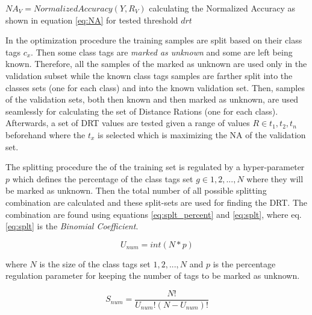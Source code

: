 \begin{algorithm}[H][t]
{{    }

    $NA_{V} = NormalizedAccuracy(Y, R_{V})$ calculating the Normalized Accuracy as shown in equation \ref{eq:NA} for tested threshold $drt$\;


}

\end{algorithm}

\hfill

In the optimization procedure the training samples are split based on their class tags $c_{x}$. Then some class tags are \textit{marked as unknown} and some are left being known. Therefore, all the samples of the marked as unknown are used only in the validation subset while the known class tags samples are farther split into the classes sets (one for each class) and into the known validation set. Then, samples of the validation sets, both then known and then marked as unknown, are used seamlessly for calculating the set of Distance Rations (one for each class). Afterwards, a set of DRT values are tested given a range of values $R \in {t_{1}, t_{2}, t_{n}}$ beforehand where the $t_{x}$ is selected which is maximizing the NA of the validation set.

The splitting procedure the of the training set is regulated by a hyper-parameter $p$ which defines the percentage of the class tags set $g \in {1,2,...,N}$ where they will be marked as unknown. Then the total number of all possible splitting combination are calculated and these split-sets are used for finding the DRT. The combination are found using equations \ref{eq:splt_percent} and \ref{eq:splt}, where eq.\ref{eq:splt} is the \textit{Binomial Coefficient}.

\begin{equation} \label{eq:splt_percent}
    U_{num} = int(N * p)
\end{equation}

\noindent
where $N$ is the size of the class tags set ${1,2,...,N}$ and $p$ is the percentage regulation parameter for keeping the number of tags to be marked as unknown.

\begin{equation} \label{eq:splt}
    S_{num} = \frac{N!}{U_{num}!(N-U_{num})!}
\end{equation}

